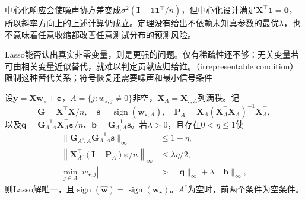 中心化响应会使噪声协方差变成$\sigma^2(\bm{I}-\bm{1}\bm{1}^{\top}/n)$，但中心化设计满足$\bm{X}^{\top}\bm{1}=\bm{0}$，所以斜率方向上的上述计算仍成立。定理没有给出不依赖未知真参数的最优$\lambda$，也不意味着任意收缩都改善任意测试分布的预测风险。

Lasso能否认出真实非零变量，则是更强的问题。仅有稀疏性还不够：无关变量若可由相关变量近似替代，就难以判定贡献应归给谁。（irrepresentable condition）限制这种替代关系；符号恢复还需要噪声和最小信号条件

\begin{theorem}[Lasso的确定性符号恢复充分条件]
  \label{thm:regression-lasso-recovery}
  设$\bm{y}=\bm{X}\bm{w}_{\star}+\bm{\varepsilon}$，$A=\{j:w_{\star,j}\ne0\}$非空，$\bm{X}_A=\bm{X}_{:,A}$列满秩。记
  \[
    \bm{G}=\bm{X}^{\top}\bm{X}/n,\quad
    \bm{s}=\operatorname{sign}(\bm{w}_{\star,A}),\quad
    \bm{P}_A=\bm{X}_A(\bm{X}_A^{\top}\bm{X}_A)^{-1}\bm{X}_A^{\top},
  \]
  以及$\bm{q}=\bm{G}_{A,A}^{-1}\bm{X}_A^{\top}\bm{\varepsilon}/n$、$\bm{b}=\bm{G}_{A,A}^{-1}\bm{s}$。若$\lambda>0$，且存在$0<\eta\leq1$使
  \begin{align}
    \lVert\bm{G}_{A^c,A}\bm{G}_{A,A}^{-1}\bm{s}\rVert_\infty
      &\leq1-\eta, \label{eq:regression-irrepresentable}\\
    \left\lVert\bm{X}_{A^c}^{\top}(\bm{I}-\bm{P}_A)
                  \bm{\varepsilon}/n\right\rVert_\infty
      &\leq\lambda\eta/2, \label{eq:regression-lasso-noise}\\
    \min_{j\in A}|w_{\star,j}|
      &>\lVert\bm{q}\rVert_\infty+\lambda\lVert\bm{b}\rVert_\infty,
      \label{eq:regression-lasso-beta-min}
  \end{align}
  则Lasso解唯一，且$\operatorname{sign}(\widehat{\bm{w}})=\operatorname{sign}(\bm{w}_{\star})$。$A^c$为空时，前两个条件为空条件。
\end{theorem}

